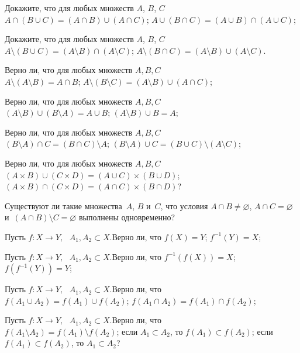 \documentclass[a4paper,12pt]{article}
\begin{document}
\newpage
\renewcommand{\spacer}{\vspace{4.1mm minus .1mm}}



Докажите, что для любых множеств $A$, $B$, $C$\\
 $A\cap(B\cup C)=(A\cap B)\cup(A\cap C)$;
 $A\cup(B\cap C)=(A\cup B)\cap(A\cup C)$;

Докажите, что для любых множеств $A$, $B$, $C$\\
 $A\setminus(B\cup C)=(A\setminus B)\cap(A\setminus C)$;
 $A\setminus(B\cap C)=(A\setminus B)\cup(A\setminus C)$.

Верно ли, что для любых множеств $A,B,C$\\
 $A\setminus(A\setminus B)=A\cap B$;
 $A\setminus(B\setminus C)=(A\setminus B)\cup(A\cap C)$;

Верно ли, что для любых множеств $A,B,C$\\
 $(A\setminus B)\cup(B\setminus A)=A\cup B$;
 $(A\setminus B)\cup B=A$;

Верно ли, что для любых множеств $A,B,C$\\
 $(B\setminus A)\cap C=(B\cap C)\setminus A$;
 $(B\setminus A)\cup C=(B\cup C)\setminus(A\setminus C)$;

Верно ли, что для любых множеств $A,B,C$\\
 $(A\times B)\cup(C\times D)=(A\cup C)\times(B\cup D)$;
 $(A\times B)\cap(C\times D)=(A\cap C)\times(B\cap D)$?

Существуют ли такие множества~$A$, $B$ и~$C$, что условия $A\cap B\ne\varnothing$, $A\cap C=\varnothing$ и~$(A\cap B)\setminus C=\varnothing$ выполнены одновременно?

Пусть $f:X\to Y,\,\,$ $A_1,A_2\subset X$.\quad Верно ли, что
 $f(X)=Y$;
 $f^{-1}(Y)=X$;

Пусть $f:X\to Y,\,\,$ $A_1,A_2\subset X$.\quad Верно ли, что
 $f^{-1}(f(X))=X$;
 $f(f^{-1}(Y))=Y$;

Пусть $f:X\to Y,\,\,$ $A_1,A_2\subset X$.\quad Верно ли, что\\
 $f(A_{1}\cup A_{2})=f(A_{1})\cup f(A_{2})$;
 $f(A_{1}\cap  A_{2})=f(A_{1})\cap  f(A_{2})$;

Пусть $f:X\to Y,\,\,$ $A_1,A_2\subset X$.\quad Верно ли, что\\
 $f(A_{1}\setminus A_{2})=f(A_{1})\setminus f(A_{2})$;
 если $A_{1}\subset A_{2}$, то $f(A_{1})\subset  f(A_{2})$;
 если $f(A_{1})\subset f(A_{2})$, то $A_{1}\subset A_{2}$?
\end{document}
